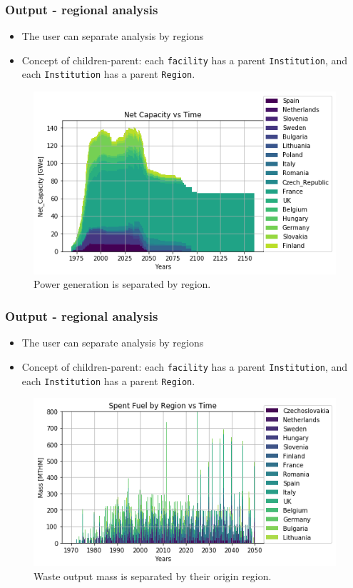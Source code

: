 \begin{frame}
    \frametitle{Output - regional analysis}
    \begin{itemize}
        \item The user can separate analysis by regions
        \item Concept of children-parent: each \texttt{facility} has a parent \texttt{Institution}, and each \texttt{Institution} has a parent \texttt{Region}.
    \end{itemize}
    \begin{figure}[htbp!]
        \begin{center}
                \includegraphics[width=.8\textwidth]{./images/sim_output/onesim.png}
        \end{center}
    \caption{Power generation is separated by region.}
    \end{figure}
\end{frame}

\begin{frame}
    \frametitle{Output - regional analysis}
    \begin{itemize}
        \item The user can separate analysis by regions
        \item Concept of children-parent: each \texttt{facility} has a parent \texttt{Institution}, and each \texttt{Institution} has a parent \texttt{Region}.
    \end{itemize}
    \begin{figure}[htbp!]
        \begin{center}
                \includegraphics[width=.8\textwidth]{./images/sim_output/regional_snf.png}
        \end{center}
    \caption{Waste output mass is separated by their origin region.}
    \end{figure}
\end{frame}

